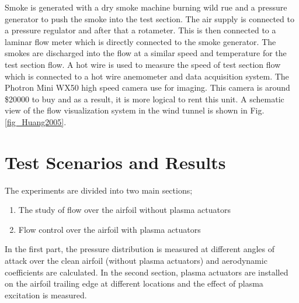 \documentclass[fleqn,10pt]{SelfArx} %
\begin{document}
Smoke is generated with a dry smoke machine burning wild rue and a pressure generator to push the smoke into the test section. The air supply is connected to a pressure regulator and after that a rotameter. This is then connected to a laminar flow meter which is directly connected to the smoke generator. The smokes are discharged into the flow at a similar speed and temperature for the test section flow. A hot wire is used to measure the speed of test section flow which is connected to a hot wire anemometer and data acquisition system.  The Photron Mini WX50 high speed camera use for imaging. This camera is around \$20000 to buy and as a result, it is more logical to rent this unit. A schematic view of the flow visualization system in the wind tunnel is shown in Fig. \ref{fig_Huang2005}.

\section{Test Scenarios and Results}
The experiments are divided into two main sections;
\begin{enumerate}
\item The study of flow over the airfoil without plasma actuators
\item Flow control over the airfoil with plasma actuators
\end{enumerate}
In the first part, the pressure distribution is measured at different angles of attack over the clean airfoil (without plasma actuators) and aerodynamic coefficients are calculated. In the second section, plasma actuators are installed on the airfoil trailing edge at different locations and the effect of plasma excitation is measured.
\end{document}

